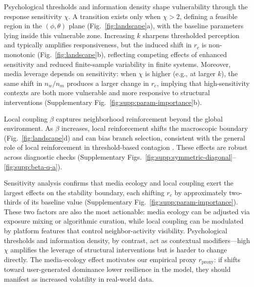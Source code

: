 \documentclass[11pt]{article}
\begin{document}
Psychological thresholds and information density shape vulnerability through the response sensitivity $\chi$. A transition exists only when $\chi>2$, defining a feasible region in the $(\phi,\theta)$ plane (Fig.~\ref{fig:landscape}a), with the baseline parameters lying inside this vulnerable zone. Increasing $k$ sharpens thresholded perception and typically amplifies responsiveness, but the induced shift in $r_c$ is non-monotonic (Fig.~\ref{fig:landscape}b), reflecting competing effects of enhanced sensitivity and reduced finite-sample variability in finite systems.
Moreover, media leverage depends on sensitivity: when $\chi$ is higher (e.g., at larger $k$), the same shift in $n_w/n_m$ produces a larger change in $r_c$, implying that high-sensitivity contexts are both more vulnerable and more responsive to structural interventions (Supplementary Fig.~\ref{fig:supp:param-importance}b).

Local coupling $\beta$ captures neighborhood reinforcement beyond the global environment. As $\beta$ increases, local reinforcement shifts the macroscopic boundary (Fig.~\ref{fig:landscape}d) and can bias branch selection, consistent with the general role of local reinforcement in threshold-based contagion \citep{Granovetter1978,Centola2010,Iacopini2019}. These effects are robust across diagnostic checks (Supplementary Figs.~\ref{fig:supp:symmetric-diagonal}--\ref{fig:supp:beta-q-a}).

Sensitivity analysis confirms that media ecology and local coupling exert the largest effects on the stability boundary, each shifting $r_c$ by approximately two-thirds of its baseline value (Supplementary Fig.~\ref{fig:supp:param-importance}). These two factors are also the most actionable: media ecology can be adjusted via exposure mixing or algorithmic curation, while local coupling can be modulated by platform features that control neighbor-activity visibility. Psychological thresholds and information density, by contrast, act as contextual modifiers---high $\chi$ amplifies the leverage of structural interventions but is harder to change directly. The media-ecology effect motivates our empirical proxy $r_{\text{proxy}}$: if shifts toward user-generated dominance lower resilience in the model, they should manifest as increased volatility in real-world data.
\end{document}
